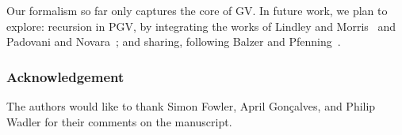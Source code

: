 \documentclass[main.tex]{subfiles}
\begin{document}
Our formalism so far only captures the core of GV. In future work, we plan to explore: recursion in PGV, by integrating the works of Lindley and Morris~\cite{lindleymorris16} and Padovani and Novara~\cite{padovaninovara15}; %
and sharing, following Balzer and Pfenning~\cite{balzerpfenning17}.

\subsubsection*{Acknowledgement}
The authors would like to thank Simon Fowler, April Gon\c{c}alves, and Philip Wadler for their comments on the manuscript.
\end{document}
